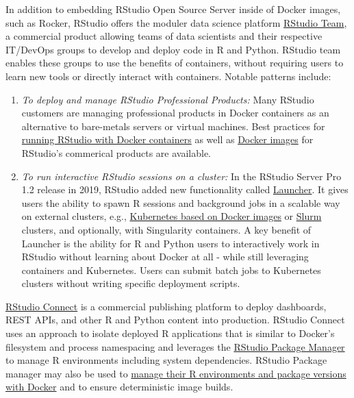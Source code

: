 \label{rstudio}

In addition to embedding RStudio Open Source Server inside of Docker
images, such as Rocker, RStudio offers the moduler data science platform
\href{https://rstudio.com/products/team/}{RStudio Team}, a commercial
product allowing teams of data scientists and their respective IT/DevOps
groups to develop and deploy code in R and Python. RStudio team enables
these groups to use the benefits of containers, without requiring users
to learn new tools or directly interact with containers. Notable
patterns include:

\begin{enumerate}
\def\labelenumi{\arabic{enumi}.}
\tightlist
\item
  \emph{To deploy and manage RStudio Professional Products:} Many
  RStudio customers are managing professional products in Docker
  containers as an alternative to bare-metals servers or virtual
  machines. Best practices for
  \href{https://support.rstudio.com/hc/en-us/articles/360021594513-Running-RStudio-with-Docker-containers}{running
  RStudio with Docker containers} as well as
  \href{https://github.com/rstudio/rstudio-docker-products}{Docker
  images} for RStudio's commerical products are available.
\item
  \emph{To run interactive RStudio sessions on a cluster:} In the
  RStudio Server Pro 1.2 release in 2019, RStudio added new
  functionality called
  \href{https://solutions.rstudio.com/launcher/overview/}{Launcher}. It
  gives users the ability to spawn R sessions and background jobs in a
  scalable way on external clusters, e.g.,
  \href{https://support.rstudio.com/hc/en-us/articles/360019253393-Using-Docker-images-with-RStudio-Server-Pro-Launcher-and-Kubernetes}{Kubernetes
  based on Docker images} or \href{https://slurm.schedmd.com/}{Slurm}
  clusters, and optionally, with Singularity containers. A key benefit
  of Launcher is the ability for R and Python users to interactively
  work in RStudio without learning about Docker at all - while still
  leveraging containers and Kubernetes. Users can submit batch jobs to
  Kubernetes clusters without writing specific deployment scripts.
\end{enumerate}

\href{https://rstudio.com/products/connect/}{RStudio Connect} is a
commercial publishing platform to deploy dashboards, REST APIs, and
other R and Python content into production. RStudio Connect uses an
approach to isolate deployed R applications that is similar to Docker's
filesystem and process namespacing and leverages the
\href{https://rstudio.com/products/package-manager/}{RStudio Package
Manager} to manage R environments including system dependencies. RStudio
Package manager may also be used to
\href{https://environments.rstudio.com/docker}{manage their R
environments and package versions with Docker} and to ensure
deterministic image builds.

